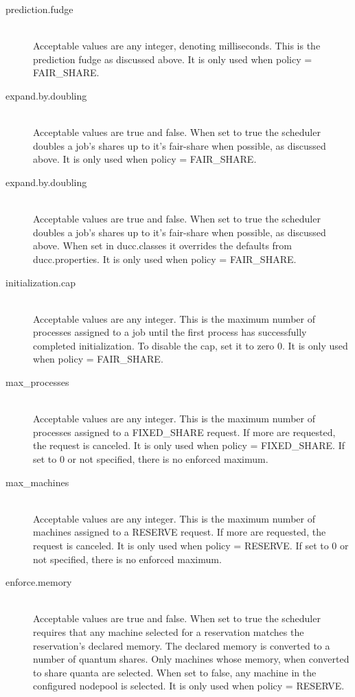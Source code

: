 \begin{description}
        \item[prediction.fudge] \hfill \\
          Acceptable values are any integer, denoting milliseconds. This is the prediction fudge as 
          discussed above. It is only used when policy = FAIR\_SHARE. 

        \item[expand.by.doubling] \hfill \\
          Acceptable values are true and false. When set to true the scheduler doubles a job's shares 
          up to it's fair-share when possible, as discussed above. It is only used when policy = 
          FAIR\_SHARE. 

        \item[expand.by.doubling] \hfill \\
          Acceptable values are true and false. When set to true the scheduler doubles a job's shares up 
          to it's fair-share when possible, as discussed above. When set in ducc.classes it overrides the 
          defaults from ducc.properties. It is only used when policy = FAIR\_SHARE. 

        \item[initialization.cap] \hfill \\
          Acceptable values are any integer. This is the maximum number of processes assigned to a job 
          until the first process has successfully completed initialization. To disable the cap, set it to zero 
          0. It is only used when policy = FAIR\_SHARE. 

        \item[max\_processes] \hfill \\
          Acceptable values are any integer. This is the maximum number of processes assigned to a 
          FIXED\_SHARE request. If more are requested, the request is canceled. It is only used when 
          policy = FIXED\_SHARE. If set to 0 or not specified, there is no enforced maximum. 

        \item[max\_machines] \hfill \\
          Acceptable values are any integer. This is the maximum number of machines assigned to a 
          RESERVE request. If more are requested, the request is canceled. It is only used when policy = 
          RESERVE. If set to 0 or not specified, there is no enforced maximum. 

        \item[enforce.memory] \hfill \\
          Acceptable values are true and false. When set to true the scheduler requires that any machine 
          selected for a reservation matches the reservation's declared memory. The declared memory 
          is converted to a number of quantum shares. Only machines whose memory, when converted 
          to share quanta are selected. When set to false, any machine in the configured nodepool is 
          selected. It is only used when policy = RESERVE. 
      \end{description}
          

        
